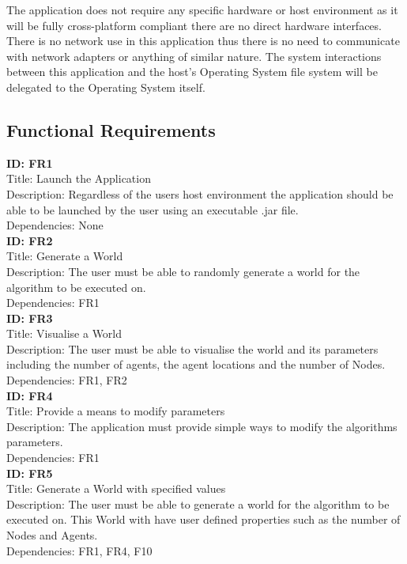The application does not require any specific hardware or host environment as it will be fully cross-platform compliant there are no direct hardware interfaces. There is no network use in this application thus there is no need to communicate with network adapters or anything of similar nature. The system interactions between this application and the host's Operating System file system will be delegated to the Operating System itself.

\subsection{Functional Requirements}
\label{funcreq}
\textbf{ID: FR1}\\
Title: Launch the Application\\
Description: Regardless of the users host environment the application should be able to be launched by the user using an executable .jar file.\\
Dependencies: None
\\

\noindent
\textbf{ID: FR2}\\
Title: Generate a World\\
Description: The user must be able to randomly generate a world for the algorithm to be executed on.\\
Dependencies: FR1
\\

\noindent
\textbf{ID: FR3}\\
Title: Visualise a World\\
Description: The user must be able to visualise the world and its parameters including the number of agents, the agent locations and the number of Nodes.\\
Dependencies: FR1, FR2
\\

\noindent
\textbf{ID: FR4}\\
Title: Provide a means to modify parameters\\
Description: The application must provide simple ways to modify the algorithms parameters.\\
Dependencies: FR1
\\

\noindent
\textbf{ID: FR5}\\
Title: Generate a World with specified values\\
Description: The user must be able to generate a world for the algorithm to be executed on. This World with have user defined properties such as the number of Nodes and Agents.\\
Dependencies: FR1, FR4, F10
\\

